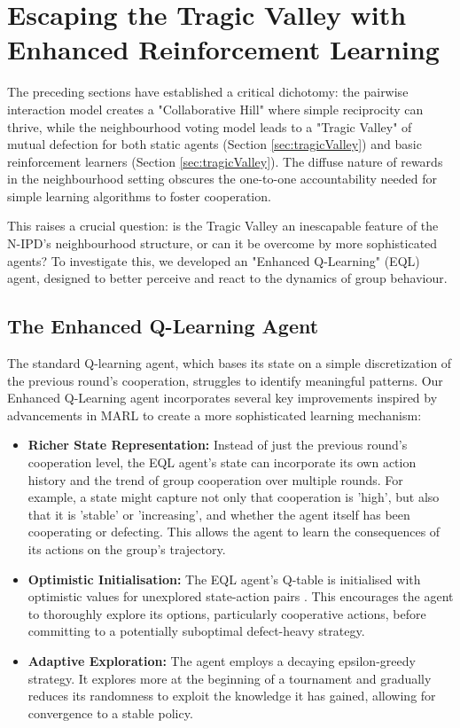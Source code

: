 \documentclass[]{llncs} %
\begin{document}
\section{Escaping the Tragic Valley with Enhanced Reinforcement Learning}
\label{sec:enhanced_rl}

The preceding sections have established a critical dichotomy: the pairwise interaction model creates a "Collaborative Hill" where simple reciprocity can thrive, while the neighbourhood voting model leads to a "Tragic Valley" of mutual defection for both static agents (Section \ref{sec:tragicValley}) and basic reinforcement learners (Section \ref{sec:tragicValley}). The diffuse nature of rewards in the neighbourhood setting obscures the one-to-one accountability needed for simple learning algorithms to foster cooperation.

This raises a crucial question: is the Tragic Valley an inescapable feature of the N-IPD's neighbourhood structure, or can it be overcome by more sophisticated agents? To investigate this, we developed an "Enhanced Q-Learning" (EQL) agent, designed to better perceive and react to the dynamics of group behaviour.

\subsection{The Enhanced Q-Learning Agent}

The standard Q-learning agent, which bases its state on a simple discretization of the previous round's cooperation, struggles to identify meaningful patterns. Our Enhanced Q-Learning agent incorporates several key improvements inspired by advancements in MARL to create a more sophisticated learning mechanism:

\begin{itemize}
    \item \textbf{Richer State Representation:} Instead of just the previous round's cooperation level, the EQL agent's state can incorporate its own action history and the trend of group cooperation over multiple rounds. For example, a state might capture not only that cooperation is 'high', but also that it is 'stable' or 'increasing', and whether the agent itself has been cooperating or defecting. This allows the agent to learn the consequences of its actions on the group's trajectory.
    \item \textbf{Optimistic Initialisation:} The EQL agent's Q-table is initialised with optimistic values for unexplored state-action pairs \cite{SuttonBarto2018}. This encourages the agent to thoroughly explore its options, particularly cooperative actions, before committing to a potentially suboptimal defect-heavy strategy.
    \item \textbf{Adaptive Exploration:} The agent employs a decaying epsilon-greedy strategy. It explores more at the beginning of a tournament and gradually reduces its randomness to exploit the knowledge it has gained, allowing for convergence to a stable policy.
\end{itemize}
\end{document}
